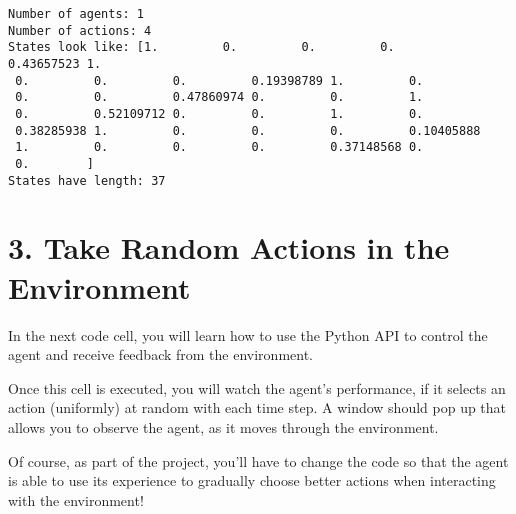 \documentclass[11pt]{article}
\begin{document}
    \begin{Verbatim}[commandchars=\\\{\}]
Number of agents: 1
Number of actions: 4
States look like: [1.         0.         0.         0.         0.43657523 1.
 0.         0.         0.         0.19398789 1.         0.
 0.         0.         0.47860974 0.         0.         1.
 0.         0.52109712 0.         0.         1.         0.
 0.38285938 1.         0.         0.         0.         0.10405888
 1.         0.         0.         0.         0.37148568 0.
 0.        ]
States have length: 37

    \end{Verbatim}

    \hypertarget{take-random-actions-in-the-environment}{%
\section{3. Take Random Actions in the
Environment}\label{take-random-actions-in-the-environment}}

In the next code cell, you will learn how to use the Python API to
control the agent and receive feedback from the environment.

Once this cell is executed, you will watch the agent's performance, if
it selects an action (uniformly) at random with each time step. A window
should pop up that allows you to observe the agent, as it moves through
the environment.

Of course, as part of the project, you'll have to change the code so
that the agent is able to use its experience to gradually choose better
actions when interacting with the environment!
\end{document}
